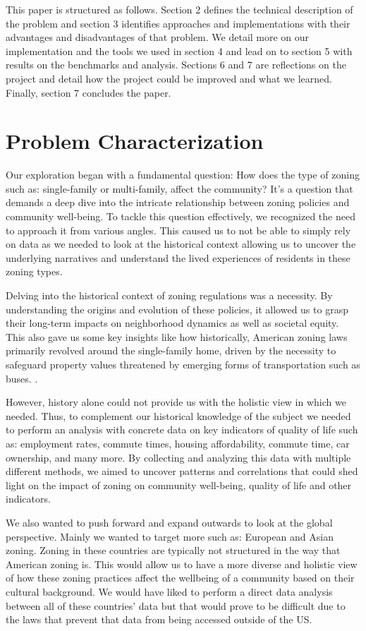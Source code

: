 \documentclass[titlepage]{article}
\begin{document}
This paper is structured  as follows. Section 2 defines the technical description of the problem and section 3 identifies approaches and implementations with their advantages and disadvantages of that problem. We detail more on our implementation and the tools we used in section 4 and lead on to section 5 with results on the benchmarks and analysis. Sections 6 and 7 are reflections on the project and detail how the project could be improved and what we learned. Finally, section 7 concludes the paper.


\section{Problem Characterization}
Our exploration began with a fundamental question: How does the type of zoning such as: single-family or multi-family, affect the community? It's a question that demands a deep dive into the intricate relationship between zoning policies and community well-being. To tackle this question effectively, we recognized the need to approach it from various angles. This caused us to not be able to simply rely on data as we needed to look at the historical context allowing us to uncover the underlying narratives and understand the lived experiences of residents in these zoning types. 

Delving into the historical context of zoning regulations was a necessity. By understanding the origins and evolution of these policies, it allowed us to grasp their long-term impacts on neighborhood dynamics as well as societal equity. This also gave us some key insights like how historically, American zoning laws primarily revolved around the single-family home, driven by the necessity to safeguard property values threatened by emerging forms of transportation such as buses. \cite{History}.

However, history alone could not provide us with the holistic view in which we needed. Thus, to complement our historical knowledge of the subject we needed to perform an analysis with concrete data on key indicators of quality of life such as: employment rates, commute times, housing affordability, commute time, car ownership, and many more. By collecting and analyzing this data with multiple different methods, we aimed to uncover patterns and correlations that could shed light on the impact of zoning on community well-being, quality of life and other indicators. 

We also wanted to push forward and expand outwards to look at the global perspective. Mainly we wanted to target more such as: European and Asian zoning. Zoning in these countries are typically not structured in the way that American zoning is. This would allow us to have a more diverse and holistic view of how these zoning practices affect the wellbeing of a community based on their cultural background. We would have liked to perform a direct data analysis between all of these countries' data but that would prove to be difficult due to the laws that prevent that data from being accessed outside of the US.
\end{document}
